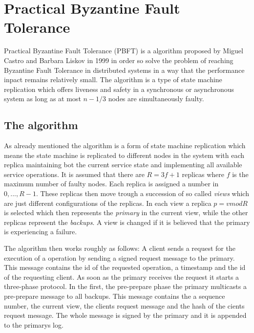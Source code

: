 \section{Practical Byzantine Fault \\
Tolerance}

Practical Byzantine Fault Tolerance (PBFT) is a algorithm proposed by Miguel Castro and Barbara Liskov in 1999 in order so solve the problem of reaching Byzantine Fault Tolerance in distributed
systems in a way that the performance inpact remains relatively small. The algorithm is a type of state machine replication which offers liveness and safety in a synchronous or
asynchronous system as long as at most $n-1/3$ nodes are simultaneously faulty.\cite{url:pbft}

\subsection{The algorithm}

As already mentioned the algorithm is a form of state machine replication which means the state machine is replicated to different nodes in the system with each replica maintaining bot the current
service state and implementing all available service operations. It is assumed that there are $R=3f+1$ replicas where $f$ is the maximum number of faulty nodes. Each replica is assigned a number
in ${0,...,R-1}$. These replicas then move trough a succession of so called \textit{views} which are just different configurations of the replicas. In each view a replica $p=v mod R$ is selected
which then represents the \textit{primary} in the current view, while the other replicas represent the \textit{backups}. A view is changed if it is believed that the primary is experiencing a
failure.

The algorithm then works roughly as follows: A client sends a request for the execution of a operation by sending a signed request message to the primary. This message contains
the id of the requested operation, a timestamp and the id of the requesting client. As soon as the primary receives the request it starts a three-phase protocol.
In the first, the pre-prepare phase the primary multicasts a pre-prepare message to all backups. This message contains the a sequence number, the current view, the clients request message
and the hash of the cients request message. The whole message is signed by the primary and it is appended to the primarys log.

